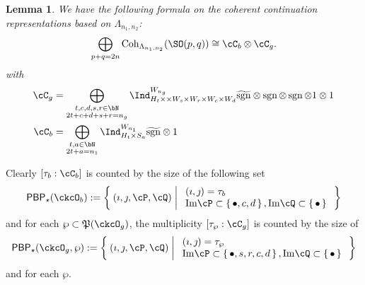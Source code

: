 \documentclass[12pt,a4paper]{amsart}
\def\Im{\operatorname{Im}}
\newcommand{\sgn}{\operatorname{sgn}}
\numberwithin{equation}{section}
\newtheorem{lem}[thm]{Lemma}
\theoremstyle{remark}
\def\Cint#1{\Coh_{[#1]}}
\def\Im{\mathrm{Im}}
\def\Coh{\mathrm{Coh}}
\def\CPP{\mathfrak{P}}
\def\hsgn{\widetilde{\mathrm{sgn}}}
\def\PBP{\mathsf{PBP}}
\def\sP{\wp}
\begin{document}
\begin{lem}
  We have the following formula on the coherent continuation
  representations based on $\Lambda_{n_{1},n_{2}}$:
  \[
    \bigoplus_{p+q=2n} \Coh_{\Lambda_{n_1, n_2}}(\SO(p,q)) \cong \cC_{b}\otimes \cC_{g}.
  \]
  with
  \[
    \begin{split}
      \cC_g %
      &=\bigoplus_{\substack{t,c,d,s,r\in\bN\\2t+c+d+s+r=n_{g}}} \Ind_{H_{t} \times \times W_s\times W_r\times W_{c}\times W_{d} }^{W_{n_{g}}}
      \hsgn \otimes \sgn \otimes \sgn \otimes 1\otimes 1\\
      \cC_b & =
      \bigoplus_{\substack{t,a\in \bN\\2t+a=n_{1}}}
      \Ind_{H_{t}\times S_{a}}^{W_{n_{1}}} \hsgn\otimes 1
    \end{split}
  \]
\end{lem}


Clearly $[\tau_{b}:\cC_{b}]$ is counted by the size of the following set
\[
  \PBP_{\star}(\ckcO_b) := \Set{(\imath,\jmath,\cP,\cQ)| %
    \begin{array}{l}
      (\imath,\jmath) = \tau_{b}\\
      \Im \cP \subset \set{\bullet,c,d}, \Im \cQ \subset\set{\bullet}\\
    \end{array}
  }
\]
and for each $\sP\subset \CPP(\ckcO_{g})$, the multiplicity
$[\tau_{\sP}: \cC_{g}]$ is counted by the size of
\[
  \PBP_{\star}(\ckcO_g,\sP):= \Set{(\imath,\jmath,\cP,\cQ)| %
    \begin{array}{l}
      (\imath,\jmath) = \tau_{\sP}\\
      \Im \cP \subset \set{\bullet,s,r,c,d}, \Im \cQ \subset\set{\bullet}\\
    \end{array}
  }
\]
and for each $\sP$.
\end{document}
